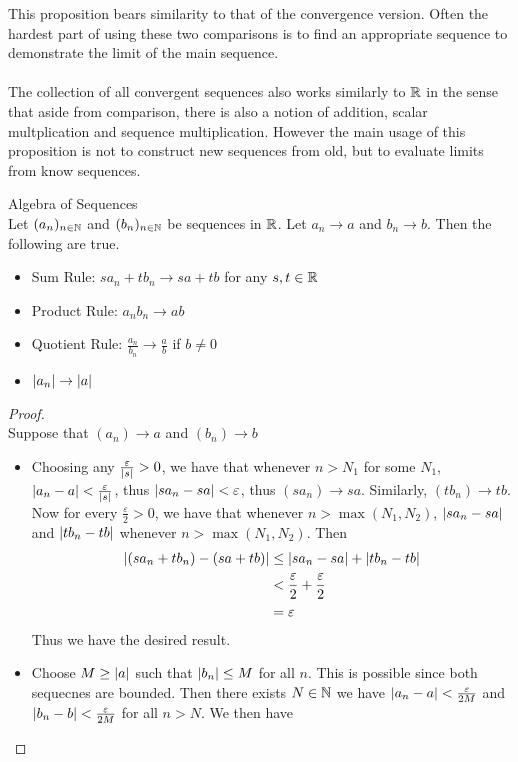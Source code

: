 \documentclass[a4paper]{article}
\begin{document}
This proposition bears similarity to that of the convergence version. Often the hardest part of using these two comparisons is to find an appropriate sequence to demonstrate the limit of the main sequence. \\~\\

The collection of all convergent sequences also works similarly to $\mathbb{R}$ in the sense that aside from comparison, there is also a notion of addition, scalar multplication and sequence multiplication. However the main usage of this proposition is not to construct new sequences from old, but to evaluate limits from know sequences. 

\begin{prp}{Algebra of Sequences}{}\\ Let $(a_n)_{n\in\mathbb{N}}$ and $(b_n)_{n\in\mathbb{N}}$ be sequences in $\mathbb{R}$. Let $a_n\to a$ and $b_n\to b$. Then the following are true. 
\begin{itemize}
\item Sum Rule: $sa_n+tb_n\to sa+tb$ for any $s,t\in\mathbb{R}$
\item Product Rule: $a_nb_n\to ab$
\item Quotient Rule: $\frac{a_n}{b_n}\to\frac{a}{b}$ if $b\neq 0$
\item $\abs{a_n}\to\abs{a}$
\end{itemize}
\begin{proof}\\ Suppose that $(a_n)\to a$ and $(b_n)\to b$
\begin{itemize}
\item Choosing any $\frac{\varepsilon}{\abs{s}}>0$, we have that whenever $n>N_1$ for some $N_1$, $\abs{a_n-a}<\frac{\varepsilon}{\abs{s}}$, thus $\abs{sa_n-sa}<\varepsilon$, thus $(sa_n)\to sa$. Similarly, $(tb_n)\to tb$. Now for every $\frac{\varepsilon}{2}>0$, we have that whenever $n>\max{(N_1,N_2)}$, $\abs{sa_n-sa}$ and $\abs{tb_n-tb}$ whenever $n>\max{(N_1,N_2)}$. Then 
\begin{align*}
\abs{(sa_n+tb_n)-(sa+tb)}&\leq\abs{sa_n-sa}+\abs{tb_n-tb} \\
&<\frac{\varepsilon}{2}+\frac{\varepsilon}{2} \\
&=\varepsilon
\end{align*}
Thus we have the desired result. 
\item Choose $M\geq\abs{a}$ such that $\abs{b_n}\leq M$ for all $n$. This is possible since both sequecnes are bounded. Then there exists $N\in\mathbb{N}$ we have $\abs{a_n-a}<\frac{\varepsilon}{2M}$ and $\abs{b_n-b}<\frac{\varepsilon}{2M}$ for all $n>N$. We then have

\end{itemize}
\end{proof}
\end{prp}
\end{document}
